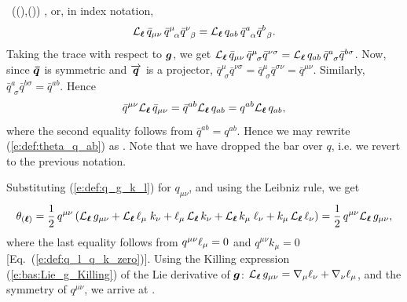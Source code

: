     \Lie{\el}  \, ((),()) ,
\ee
or, in index notation,
\[
    \Liec{\el} {\bar q}_{\mu\nu} \, {\bar q}^\mu_{\ \, \alpha} {\bar q}^\nu_{\ \, \beta} =
        \Liec{\el} {q}_{ab} \, {\bar q}^a_{\ \, \alpha} {\bar q}^b_{\ \, \beta} .
\]
Taking the trace with respect to $\bm{g}$, we get
$ {\mathcal{L}}_{\bm{\ell}}\, {\bar q}_{\mu\nu} \, {\bar q}^\mu_{\ \, \sigma} {\bar q}^{\nu\sigma} =
        {\mathcal{L}}_{\bm{\ell}}\, {q}_{ab} \, {\bar q}^a_{\ \, \sigma} {\bar q}^{b\sigma}$.
Now, since $\bm{\bar q}$ is symmetric and $\overrightarrow{\bm{q}}$ is a projector,
${\bar q}^\mu_{\ \, \sigma} {\bar q}^{\nu\sigma} = {\bar q}^\mu_{\ \, \sigma} {\bar q}^{\sigma\nu}
 = {\bar q}^{\mu\nu}$. Similarly, ${\bar q}^a_{\ \, \sigma} {\bar q}^{b\sigma} = {\bar q}^{ab}$.
Hence
\[
    {\bar q}^{\mu\nu} {\mathcal{L}}_{\bm{\ell}}\, {\bar q}_{\mu\nu} = {\bar q}^{ab}  {\mathcal{L}}_{\bm{\ell}}\, {q}_{ab}
    = q^{ab}  {\mathcal{L}}_{\bm{\ell}}\, {q}_{ab} ,
\]
where the second equality follows from
${\bar q}^{ab}  = q^{ab}$.
Hence we may rewrite (\ref{e:def:theta_q_ab}) as
\be \label{e:def:theta_q_munu}
   .
\ee
Note that we have dropped the bar over $q$, i.e. we revert to the previous notation.

Substituting (\ref{e:def:q_g_k_l}) for $q_{\mu\nu}$, and using the Leibniz rule, we get
\[
    \theta_{(\bm{\ell})} = \frac{1}{2} \, q^{\mu\nu}  \left(
            {\mathcal{L}}_{\bm{\ell}}\, g_{\mu\nu} + {\mathcal{L}}_{\bm{\ell}}\,  \ell_\mu \; k_\nu + \ell_\mu \, {\mathcal{L}}_{\bm{\ell}}\, k_\nu
           + {\mathcal{L}}_{\bm{\ell}}\, k_\mu \; \ell_\nu + k_\mu \, {\mathcal{L}}_{\bm{\ell}}\, \ell_\nu \right)
           = \frac{1}{2} \, q^{\mu\nu}  {\mathcal{L}}_{\bm{\ell}}\, g_{\mu\nu}  ,
\]
where the last equality follows from $q^{\mu\nu} \ell_\mu = 0$
and  $q^{\mu\nu} k_\mu = 0$ [Eq.~(\ref{e:def:q_l_q_k_zero})]. Using
the Killing expression (\ref{e:bas:Lie_g_Killing}) of the Lie derivative of $\bm{g}$:
${\mathcal{L}}_{\bm{\ell}}\, g_{\mu\nu} = \nabla_\mu \ell_\nu + \nabla_\nu \ell_\mu$, and
the symmetry of $q^{\mu\nu}$, we arrive at
\be
     .
\ee

